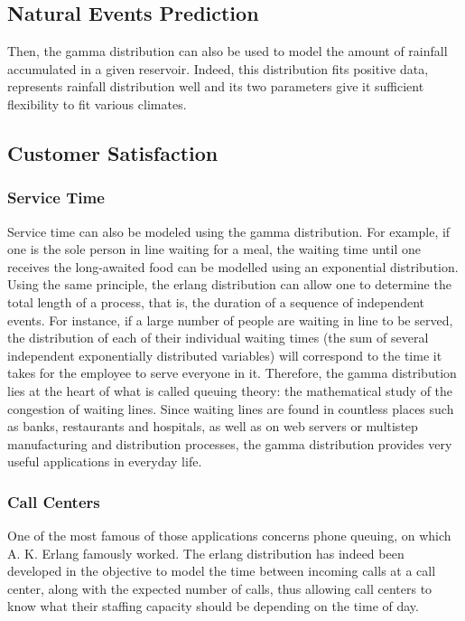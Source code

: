 \documentclass[12pt]{article}
\begin{document}
\subsection{Natural Events Prediction}
Then, the gamma distribution can also be used to model the amount of rainfall accumulated in a given reservoir. Indeed,
this distribution fits positive data, represents rainfall distribution well and its two parameters
give it sufficient flexibility to fit various climates\cite{husakUseGammaDistribution2007}.

\subsection{Customer Satisfaction}
\subsubsection{Service Time}
Service time can also be modeled using the gamma distribution. For example, if one is the sole person in line waiting for a meal, the
waiting time until one receives the long-awaited food can be modelled using an exponential distribution. Using the same
principle, the erlang distribution can allow one to determine the total length of a process, that is, the duration of a
sequence of independent events. For instance, if a large number of people are waiting in line to be served, the
distribution of each of their individual waiting times (the sum of several independent exponentially distributed
variables) will correspond to the time it takes for the employee to serve everyone in it. Therefore, the gamma
distribution lies at the heart of what is called queuing theory: the mathematical study of the congestion of waiting
lines. Since waiting lines are found in countless places such as banks, restaurants and hospitals, as well as on web
servers or multistep manufacturing and distribution processes, the gamma distribution provides very useful applications
in everyday life.

\subsubsection{Call Centers}
One of the most famous of those applications concerns phone queuing, on which A. K. Erlang famously worked. The erlang
distribution has indeed been developed in the objective to model the time between incoming calls at a call center, along
with the expected number of calls, thus allowing call centers to know what their staffing capacity should be depending
on the time of day.
\end{document}
